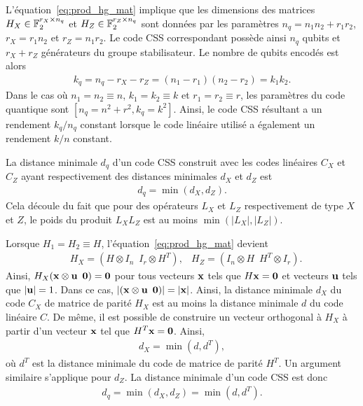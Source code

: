 L'équation~\eqref{eq:prod_hg_mat} implique que les dimensions des matrices
$H_X \in \mathbb{F}_{2}^{r_X \times n_q}$ et $H_Z \in \mathbb{F}_{2}^{r_Z \times n_q}$ 
sont données par les paramètres $n_q = n_1 n_2 + r_1 r_2$, $r_X = r_1 n_2$ et $r_Z = n_1 r_2$.
Le code CSS correspondant possède ainsi $n_q$ qubits et $r_X + r_Z$ générateurs du groupe stabilisateur.
Le nombre de qubits encodés est alors
\begin{align}
	k_q 
	= 
	n_q - r_X - r_Z
	= (n_1 - r_1)(n_2 - r_2)
	= k_1 k_2.
\end{align}
Dans le cas où $n_1 = n_2 \equiv n$, $k_1 = k_2 \equiv k$ et $r_1 = r_2 \equiv r$,
les paramètres du code quantique sont $[n_q = n^2 + r^2, k_q = k^2]$.
Ainsi,
le code CSS résultant a un rendement $k_q / n_q$ constant lorsque le code linéaire utilisé 
a également un rendement $k/n$ constant.

La distance minimale $d_q$ d'un code CSS construit avec les codes linéaires $C_X$ et $C_Z$ 
ayant respectivement des distances minimales $d_X$ et $d_Z$ est~\cite{calderbank_good_1996}
\begin{align}
	d_q = \min(d_X, d_Z).
\end{align}
Cela découle du fait que pour des opérateurs $L_X$ et $L_Z$ respectivement de type $X$ et $Z$,
le poids du produit $L_X L_Z$ est au moins $\min(|L_X|, |L_Z|)$.

Lorsque $H_1 = H_2 \equiv H$,
l'équation~\eqref{eq:prod_hg_mat} devient
\begin{align}
	&H_X = (H \otimes I_{n}\, \, \, I_{r} \otimes H^T),
	&H_Z = (I_{n} \otimes H \, \, \, H^T \otimes I_{r}).
\end{align}
Ainsi,
$H_X(\vb x \otimes \vb u \, \, \, \vb 0) = \vb 0$ 
pour tous vecteurs $\vb x$ tels que $H \vb x = \vb 0$ et vecteurs $\vb u$ 
tels que $|\vb u| = 1$.
Dans ce cas,
$|(\vb x \otimes \vb u \, \, \, \vb 0)| = |\vb x|$.
Ainsi,
la distance minimale $d_X$ du code $C_X$ de matrice de parité $H_X$ est au moins la distance
minimale $d$ du code linéaire $C$.
De même,
il est possible de construire un vecteur orthogonal à $H_X$ à partir d'un vecteur $\vb x$
tel que $H^T \vb x = \vb 0$.
Ainsi,
\begin{align}
	d_X = \min(d, d^T),
\end{align}
où $d^T$ est la distance minimale du code de matrice de parité $H^T$.
Un argument similaire s'applique pour $d_Z$.
La distance minimale d'un code CSS est donc~\cite{tillich_quantum_2014}
\begin{align}
	d_q = \min(d_X, d_Z) = \min(d, d^T).
\end{align}

